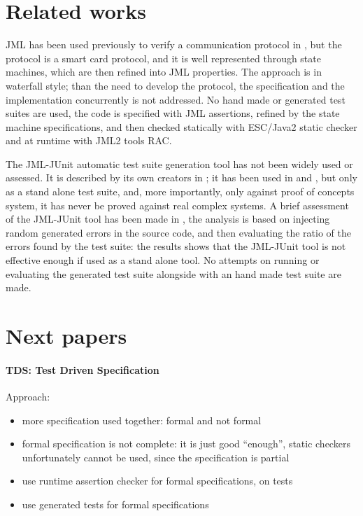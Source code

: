 \documentclass{article} \usepackage{times}
\begin{document}
\section{Related works}

JML has been used previously to verify a communication protocol in
\cite{Hubbers2004}, but the protocol is a smart card protocol, and it
is well represented through state machines, which are then refined
into JML properties.  The approach is in waterfall style; than the
need to develop the protocol, the specification and the implementation
concurrently is not addressed.  No hand made or generated test suites
are used, the code is specified with JML assertions, refined by the
state machine specifications, and then checked statically with
ESC/Java2 static checker\cite{CokKiniry04} and at runtime with JML2
tools RAC\cite{BurdyEtal05-STTT}.

The JML-JUnit automatic test suite generation tool has not been widely
used or assessed. It is described by its own creators in
\cite{Cheon2002,Cheon2004,Cheon2005}; it has been used in
\cite{Oriat2004} and \cite{Cheon2005}, but only as a stand alone test
suite, and, more importantly, only against proof of concepts system,
it has never be proved against real complex systems.  A brief
assessment of the JML-JUnit tool has been made in \cite{Tan2004}, the
analysis is based on injecting random generated errors in the source
code, and then evaluating the ratio of the errors found by the test
suite: the results shows that the JML-JUnit tool is not effective
enough if used as a stand alone tool. No attempts on running or
evaluating the generated test suite alongside with an hand made test
suite are made.








\section{Next papers}

\paragraph*{TDS: Test Driven Specification}

Approach:
\begin{itemize}
\item more specification used together: formal and not formal
\item formal specification is not complete: it is just good
  ``enough'', static checkers unfortunately cannot be used, since the
  specification is partial
\item use runtime assertion checker for formal specifications, on
  tests
\item use generated tests for formal specifications
\end{itemize}
\end{document}
